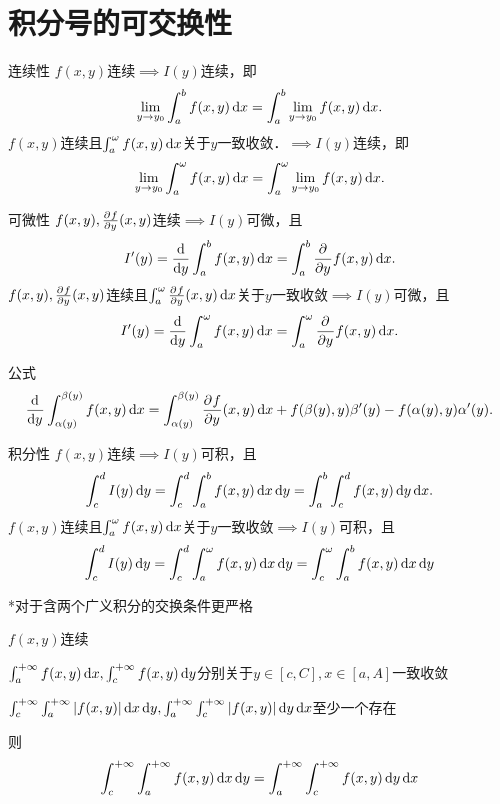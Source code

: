 \section{积分号的可交换性}
\begin{theorem}{连续性}{}
	$f(x,y)$连续$\implies I(y)$连续，即
	\[
		\lim_{y\to y_0}\int_a^bf(x,y)\d x=\int_a^b\lim_{y\to y_0}f(x,y)\d x.
	\]
	\tcblower
	$f(x,y)$连续且$\int_a^\omega f(x,y)\d x$关于$y$一致收敛．$\implies I(y)$连续，即
	\[
		\lim_{y\to y_0}\int_a^\omega f(x,y)\d x=\int_a^\omega\lim_{y\to y_0}f(x,y)\d x.
	\]
\end{theorem}
\begin{theorem}{可微性}{}
	$f(x,y),\pv fy(x,y)$连续$\implies I(y)$可微，且
	\[
		I'(y)=\frac{\d}{\d y}\int_a^bf(x,y)\d x=\int_a^b\pp yf(x,y)\d x.
	\]
	\tcblower
	$f(x,y),\pv{f}{y}(x,y)$连续且$\int_a^\omega\pv{f}{y}(x,y)\d x$关于$y$一致收敛$\implies I(y)$可微，且
	\[
		I'(y)=\frac{\d}{\d y}\int_a^\omega f(x,y)\d x=\int_a^\omega\pp yf(x,y)\d x.
	\]
\end{theorem}
公式
\[
	\dv{}y\int_{\alpha(y)}^{\beta(y)}f(x,y)\d x=\int_{\alpha(y)}^{\beta(y)}\pv fy(x,y)\d x+f(\beta(y),y)\beta'(y)-f(\alpha(y),y)\alpha'(y).
\]
\begin{theorem}{积分性}{}
	$f(x,y)$连续$\implies I(y)$可积，且
	\[
		\int_c^dI(y)\d y=\int_c^d\int_a^b f(x,y)\d x\d y=\int_a^b\int_c^d f(x,y)\d y\d x.
	\]
	\tcblower
	$f(x,y)$连续且$\int_a^\omega f(x,y)\d x$关于$y$一致收敛$\implies I(y)$可积，且
	\[
		\int_c^dI(y)\d y=\int_c^d\int_a^\omega f(x,y)\d x\d y=\int_c^\omega\int_a^b f(x,y)\d x\d y
	\]
\end{theorem}
*对于含两个广义积分的交换条件更严格
\begin{compactenum}
	\item $f(x,y)$连续
	\item $\int_a^{+\infty}f(x,y)\d x,\int_c^{+\infty}f(x,y)\d y$分别关于$y\in[c,C],x\in[a,A]$一致收敛
	\item $\int_c^{+\infty}\int_a^{+\infty}|f(x,y)|\d x\d y,\int_a^{+\infty}\int_c^{+\infty}|f(x,y)|\d y\d x$至少一个存在
\end{compactenum}
则
\[
	\int_c^{+\infty}\int_a^{+\infty}f(x,y)\d x\d y=\int_a^{+\infty}\int_c^{+\infty}f(x,y)\d y\d x
\]

